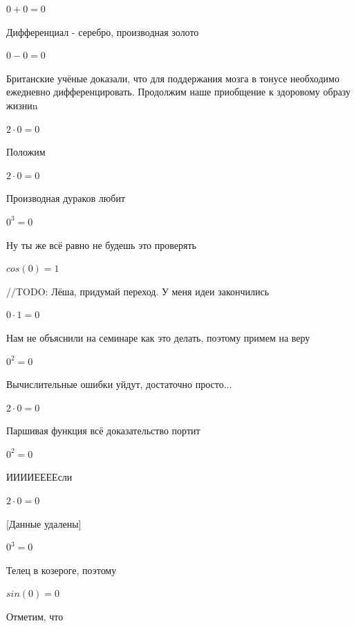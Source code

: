 \documentclass[12pt,a4paper,fleqn]{article}
\begin{document}
\begin{center}$0+0 = 0$\end{center}
Дифференциал - серебро, производная золото\cite{link2}

\begin{center}$0-0 = 0$\end{center}
Британские учёные доказали, что для поддержания мозга в тонусе необходимо ежедневно дифференцировать. Продолжим наше приобщение к здоровому образу жизниn

\begin{center}$2 \cdot 0 = 0$\end{center}
Положим

\begin{center}$2 \cdot 0 = 0$\end{center}
Производная дураков любит\cite{link2}

\begin{center}$0^{3} = 0$\end{center}
Ну ты же всё равно не будешь это проверять

\begin{center}$cos(0) = 1$\end{center}
//TODO: Лёша, придумай переход. У меня идеи закончились

\begin{center}$0 \cdot 1 = 0$\end{center}
Нам не объяснили на семинаре как это делать, поэтому примем на веру

\begin{center}$0^{2} = 0$\end{center}
Вычислительные ошибки уйдут, достаточно просто...

\begin{center}$2 \cdot 0 = 0$\end{center}
Паршивая функция всё доказательство портит\cite{link2}

\begin{center}$0^{2} = 0$\end{center}
ИИИИЕЕЕЕсли\cite{link3}

\begin{center}$2 \cdot 0 = 0$\end{center}
[Данные удалены]

\begin{center}$0^{3} = 0$\end{center}
Телец в козероге, поэтому

\begin{center}$sin(0) = 0$\end{center}
Отметим, что
\end{document}
